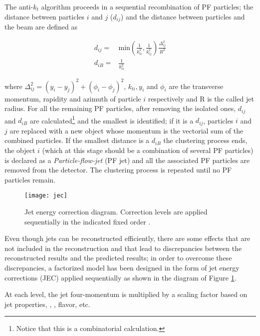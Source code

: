 \noindent The anti-$k_t$ algorithm proceeds in a sequential recombination of PF particles; the distance between particles $i$ and $j$ ($d_{ij}$)  and the distance between particles and the beam are defined as

\begin{align}\label{cov_der}
  d_{ij} = & \textrm{min}\left(\frac{1}{k_{ti}^2},\frac{1}{k_{tj}^2}\right)\frac{\Delta_{ij}^2}{R^2} \nonumber\\
  d_{iB} = & \frac{1}{k_{ti}^2}
\end{align}

\noindent where $\Delta_{ij}^2=(y_i-y_j)^2 + (\phi_i-\phi_j)^2$, $k_{ti}, y_i$ and $\phi_i$ are the transverse momentum, rapidity and azimuth of particle $i$ respectively and R is the called jet radius. For all the remaining PF particles, after removing the isolated ones, $d_{ij}$ and $d_{iB}$ are calculated\footnote{Notice that this is a combinatorial calculation.} and the smallest is identified; if it is a $d_{ij}$, particles $i$ and $j$ are replaced with a new object whose momentum is the vectorial sum of the combined particles. If the smallest distance is a $d_{iB}$ the clustering process ends, the object $i$ (which at this stage should be a combination of several PF particles) is declared as a \textit{Particle-flow-jet} (PF jet) and all the associated PF particles are removed from the detector. The clustering process is repeated until no PF particles remain.

\begin{figure}[!h]
  \centering
  \texttt{[image: jec]}
  \caption[Jet energy corrections.]{Jet energy correction diagram. Correction levels are applied sequentially in the indicated fixed order \cite{jec2}.}\label{fig:jec}
\end{figure}

\noindent Even though jets can be reconstructed efficiently, there are some effects that are not included in the reconstruction and that lead to discrepancies between the reconstructed results and the predicted results; in order to overcome these discrepancies, a factorized model has been designed in the form of jet energy corrections (JEC) \cite{jec,jec2} applied  sequentially as shown in the diagram of Figure \ref{fig:jec}.

\noindent At each level, the jet four-momentum is multiplied by a scaling factor based on jet properties, \ie, \etac, flavor, etc.

